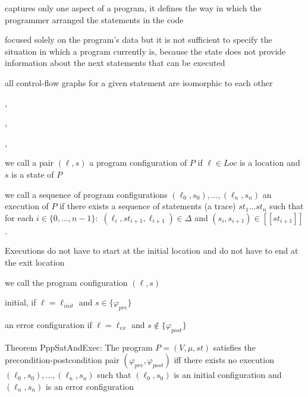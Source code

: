 \documentclass[landscape, a4paper]{article}
\begin{document}
\begin{minipage}[t]{0.2\linewidth}
\begin{betterlist}
\begin{betterlist}
			\item captures only one aspect of a program, it defines the way in which the programmer arranged the statements in the code
			\item focused solely on the program’s data but it is not sufficient to specify the situation in which a program currently is, because the state does not provide information about the next statements that can be executed
			\item {}
			\item all control-flow graphs for a given statement are \alert{isomorphic} to each other
		\end{betterlist}
		\item {}, 
		\item {}, 
		\item {}, 
		\item {}
		\item \color{orange}we call a pair $(\ell, s)$ a \alert{program configuration} of $P$ if $\ell \in Loc$ is a location and $s$ is a state of $P$\color{black}
		\item \color{orange}we call a sequence of program configurations $(\ell_0, s_0), . . . , (\ell_n, s_n)$ an \alert{execution} of $P$ if there exists a sequence of statements (a trace) $st_1 \ldots st_n$ such that for each $i \in \{0, \ldots, n−1\}:$ $(\ell_i, st_{i+1}, \ell_{i+1}) \in \Delta$ and $(s_i, s_{i+1}) \in [[st_{i+1}]]$. \color{black}
		\begin{betterlist}
			\item Executions do not have to start at the initial location and do not have to end at the exit location
		\end{betterlist}
		\item \color{orange}we call the program configuration $(\ell, s)$
		\begin{betterlist}
			\item \alert{initial}, if $\ell= \ell_{init}$ and $s \in\{\varphi_{pre}\}$
			\item an \alert{error configuration} if $\ell= \ell_{ex}$ and $s \not\in \{\varphi_{post}\}$
		\end{betterlist}\color{black}
		\item \color{orange}\alert{Theorem PppSatAndExec:} The program $P = (V, \mu, st)$ satisfies the precondition-postcondition pair $(\varphi_{pre}, \varphi_{post})$ iff there exists no execution $(\ell_0, s_0), \ldots, (\ell_n, s_n)$ such that $(\ell_0, s_0)$ is an initial configuration and $(\ell_n, s_n)$ is an error configuration\color{black}

\end{betterlist}
\end{minipage}
\end{document}
